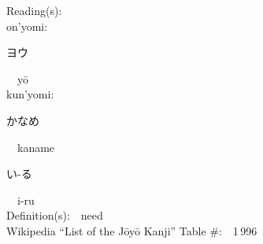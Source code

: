 \begin{multicols}{2}
Reading(s):\ \ \\
{\hspace*{1em}}on'yomi:\ \ \\
{\hspace*{2em}}{\begin{CJK}{UTF8}{min} ヨウ \end{CJK}}\ \ y\=o\ \ \\
{\hspace*{1em}}kun'yomi:\ \ \\
{\hspace*{2em}}{\begin{CJK}{UTF8}{min} かなめ \end{CJK}}\ \ kaname\ \ \\
{\hspace*{2em}}{\begin{CJK}{UTF8}{min} い-る \end{CJK}}\ \ i-ru\ \ \\
Definition(s):\ \ need \\
Wikipedia ``List of the J\=oy\=o Kanji'' Table \#:\ \ 1\,996 \\
\ \ \\
\end{multicols}



